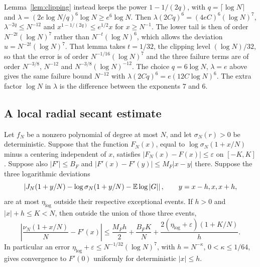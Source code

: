 \begin{remark}
Lemma~\ref{lem:clipping} instead keeps the power $1-1/(2q)$, with
$q=\lceil\log N\rceil$ and
$\lambda=(2e\log N/q)^6\log N\ge e^6\log N$.
Then $\lambda(2Cq)^6=(4eC)^6(\log N)^7$,
$\lambda^{-2q}\le N^{-12}$ and $x^{1-1/(2q)}\le e^{1/2}x$ for
$x\ge N^{-1}$. The lower tail is then of order $N^{-2t}(\log N)^7$ rather
than $N^{-t}(\log N)^6$, which allows the deviation
$u=N^{-2t}(\log N)^7$. That lemma takes $t=1/32$, the clipping level
$(\log N)/32$, so that the error is of order $N^{-1/16}(\log N)^7$ and
the three failure terms are of order $N^{-3/8}$, $N^{-12}$ and
$N^{-3/8}(\log N)^{-12}$. The choice $q=6\log N$, $\lambda=e$ above
gives the same failure bound $N^{-12}$ with
$\lambda(2Cq)^6=e(12C\log N)^6$. The extra factor $\log N$ in $\lambda$
is the difference between the exponents $7$ and $6$.
\end{remark}

\subsection{A local radial secant estimate}

\begin{lemma}\label{lem:local-radial-secant}
Let $f_N$ be a nonzero polynomial of degree at most $N$, and let
$\sigma_N(r)>0$ be deterministic. Suppose that the function $F_N(x)$,
equal to $\log\sigma_N(1+x/N)$ minus a centering independent of $x$,
satisfies $|F_N(x)-F(x)|\leq\varepsilon$ on $[-K,K]$.
Suppose also $|F'|\leq B_F$ and
$|F'(x)-F'(y)|\leq M_F|x-y|$ there.
Suppose the three logarithmic deviations
\[
 \left|J_N(1+y/N)-\log\sigma_N(1+y/N)-\mathbb E\log|G|\right|,
 \qquad y=x-h,x,x+h,
\]
are at most $\eta_{\log}$ outside their respective exceptional events.
If $h>0$ and $|x|+h\leq K<N$, then outside the union of those three events,
\begin{equation}
 \left|\frac{\nu_N(1+x/N)}N-F'(x)\right|
 \leq\frac{M_Fh}{2}+\frac{B_FK}{N}
       +\frac{2(\eta_{\log}+\varepsilon)(1+K/N)}h. \label{eq:T2-moving}
\end{equation}
In particular an
error $\eta_{\log}+\varepsilon\leq N^{-1/32}(\log N)^7$, with $h=N^{-\kappa}$,
$0<\kappa\leq1/64$, gives convergence to $F'(0)$ uniformly for
deterministic $|x|\leq h$.
\end{lemma}

